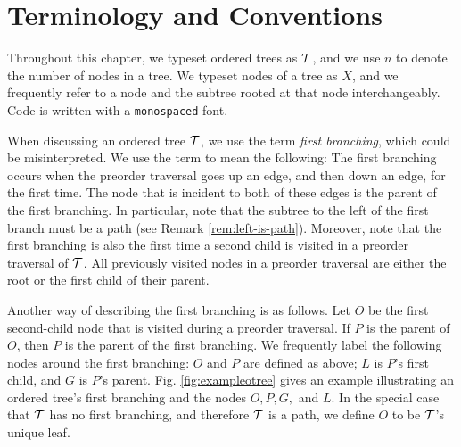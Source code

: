 \section{Terminology and Conventions} \label{sec:termsandcons}

Throughout this chapter, we typeset ordered trees as $\mathcal{T}$, and we use $n$ to denote the number of nodes in a tree.
We typeset nodes of a tree as $X$, and we frequently refer to a node and the subtree rooted at that node interchangeably.
Code is written with a \texttt{monospaced} font.

When discussing an ordered tree $\mathcal{T}$, we use the term \emph{first branching}, which could be misinterpreted. 
We use the term to mean the following: 
The first branching occurs when the preorder traversal goes up an edge, and then down an edge, for the first time.
The node that is incident to both of these edges is the parent of the first branching.
In particular, note that the subtree to the left of the first branch must be a path (see Remark \ref{rem:left-is-path}). Moreover, note that the first branching is also the first time a second child is visited in a preorder traversal of $\mathcal{T}$.  All previously visited nodes in a preorder traversal are either the root or the first child of their parent.


Another way of describing the first branching is as follows.
Let $O$ be the first second-child node that is visited during a preorder traversal.
If $P$ is the parent of $O$, then $P$ is the parent of the first branching.
We frequently label the following nodes around the first branching: $O$ and $P$ are defined as above; $L$ is $P$'s first child, and $G$ is $P$'s parent. 
Fig. \ref{fig:exampleotree} gives an example illustrating an ordered tree's first branching and the nodes $O,P,G,$ and $L$. In the special case that $\mathcal{T}$ has no first branching, and therefore $\mathcal{T}$ is a path, we define $O$ to be $\mathcal{T}$'s unique leaf.





